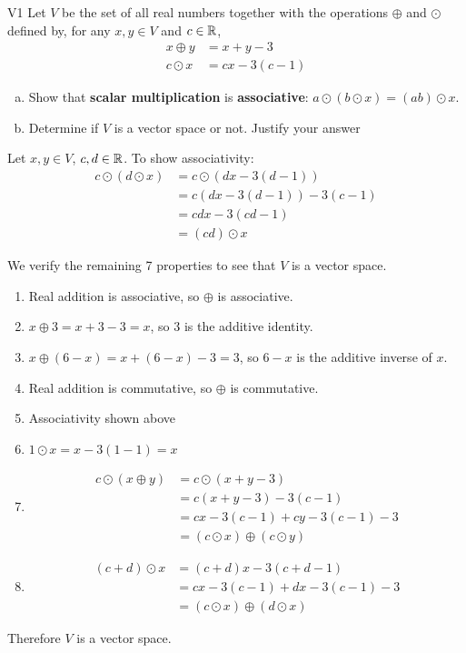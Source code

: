 \documentclass{sbgLAsemi}
\begin{document}
\begin{problem}{V1}
Let $V$ be the  set of all real numbers together with the operations $\oplus$ and $\odot$ defined by, for any $x,y \in V$ and $c \in \mathbb{R}$,
\begin{align*}
x\oplus y  &= x+y-3 \\
c \odot x &= cx-3(c-1)
\end{align*}
\begin{enumerate}[(a)]
\item Show that \textbf{scalar multiplication} is
      \textbf{associative}: \(a\odot(b\odot x)=(ab)\odot x\).
\item Determine if $V$ is a vector space or not.  Justify your answer
\end{enumerate}
\end{problem}

\begin{solution}
Let $x,y \in V$, $c,d \in \mathbb{R}$.
To show associativity:
\begin{align*}
c\odot \left( d \odot x\right) &= c\odot \left( dx-3(d-1) \right) \\
&= c\left(dx-3(d-1)\right)-3(c-1) \\
&= cdx-3(cd-1) \\
&= (cd) \odot x
\end{align*}

We verify the remaining 7 properties to see that $V$ is a vector space.
\begin{enumerate}[1)]
\item Real addition is associative, so $\oplus$ is associative.
\item $x\oplus 3 = x+3-3=x$, so $3$ is the additive identity.
\item $x \oplus (6-x) = x+(6-x)-3=3$, so $6-x$ is the additive inverse of $x$.
\item Real addition is commutative, so $\oplus$ is commutative.
\item Associativity shown above
\item $1 \odot x = x-3(1-1)=x$
\item \begin{align*} c \odot (x \oplus y) &=
c \odot (x+y-3) \\
&= c(x+y-3)-3(c-1) \\
&= cx-3(c-1) + cy-3(c-1) -3 \\
&= (c\odot x ) \oplus (c\odot y)
\end{align*}
\item \begin{align*} (c+d) \odot x &= (c+d)x-3(c+d-1) \\
&= cx-3(c-1)+dx-3(c-1)-3 \\
&= (c\odot x ) \oplus (d \odot x)
\end{align*}
\end{enumerate}

Therefore $V$ is a vector space.
\end{solution}
\end{document}
